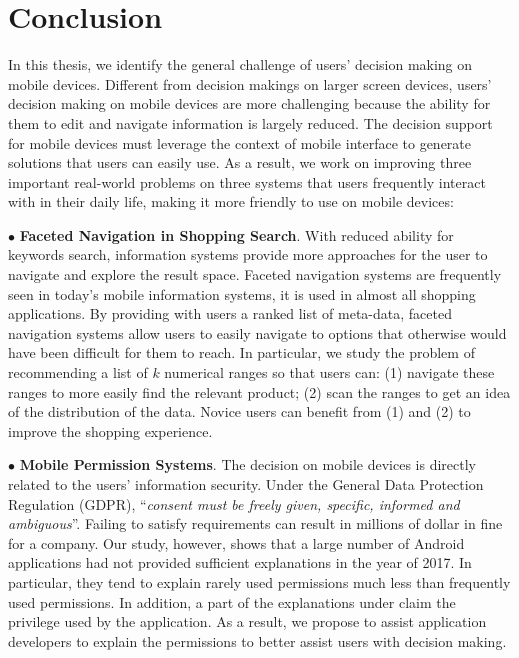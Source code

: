 
\chapter{Conclusion}
\label{ch6:conclusion}

In this thesis, we identify the general challenge of users' decision making on mobile devices. Different from decision makings on larger screen devices, users' decision making on mobile devices are more challenging because the ability for them to edit and navigate information is largely reduced. The decision support for mobile devices must leverage the context of mobile interface to generate solutions that users can easily use. As a result, we work on improving three important real-world problems on three systems that users frequently interact with in their daily life, making it more friendly to use on mobile devices:

$\bullet$ \textbf{Faceted Navigation in Shopping Search}. With reduced ability for keywords search, information systems provide more approaches for the user to navigate and explore the result space. Faceted navigation systems are frequently seen in today's mobile information systems, it is used in almost all shopping applications. By providing with users a ranked list of meta-data, faceted navigation systems allow users to easily navigate to options that otherwise would have been difficult for them to reach. In particular, we study the problem of recommending a list of $k$ numerical ranges so that users can: (1) navigate these ranges to more easily find the relevant product; (2) scan the ranges to get an idea of the distribution of the data. Novice users can benefit from (1) and (2) to improve the shopping experience. 

$\bullet$ \textbf{Mobile Permission Systems}. The decision on mobile devices is directly related to the users' information security. Under the General Data Protection Regulation (GDPR), ``\emph{consent must be freely given, specific, informed and ambiguous}''. Failing to satisfy requirements can result in millions of dollar in fine for a company. Our study, however, shows that a large number of Android applications had not provided sufficient explanations in the year of 2017. In particular, they tend to explain rarely used permissions much less than frequently used permissions. In addition, a part of the explanations under claim the privilege used by the application. As a result, we propose to assist application developers to explain the permissions to better assist users with decision making. 

